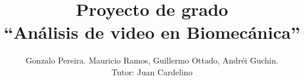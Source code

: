 \documentclass[11pt,a4paper,titlepage,spanish]{article}
\title{Proyecto de grado\\ ``Análisis de video en Biomecánica''}
\author{Gonzalo Pereira. Mauricio Ramos, Guillermo Ottado, Andréi Guchin. \\
Tutor: Juan Cardelino}
\date {}
\begin{document}
\maketitle

\newpage
\tableofcontents
\newpage




\clearpage

\clearpage

\clearpage

\clearpage

\clearpage

\clearpage

\clearpage

\clearpage

\clearpage

\clearpage

\clearpage

\clearpage

\clearpage

\clearpage

\clearpage


\nocite{*} %




%
%
\end{document}
